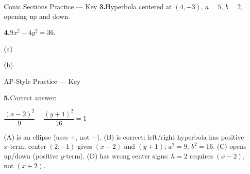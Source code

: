\documentclass[10pt]{article}
\begin{document}
\begin{notesbox}{Conic Sections Practice --- Key}
\vspace{10pt}
\textbf{3.}\quad Hyperbola centered at $(4,-3)$, $a=5$, $b=2$, opening up and down.

\vspace{6pt}

\vspace{4pt}

\vspace{10pt}
\textbf{4.}\quad $9x^2 - 4y^2 = 36$.

\vspace{4pt}
(a)\quad {}

\vspace{8pt}
(b)\quad {}

\end{notesbox}

\vspace{0.08in}

\begin{notesbox}{AP-Style Practice --- Key}

\textbf{5.}\quad Correct answer: 

$\dfrac{(x-2)^2}{9} - \dfrac{(y+1)^2}{16} = 1$

\begin{teachernote}
  (A) is an ellipse (uses $+$, not $-$). (B) is correct: left/right hyperbola has positive
  $x$-term; center $(2,-1)$ gives $(x-2)$ and $(y+1)$; $a^2=9$, $b^2=16$. (C) opens up/down
  (positive $y$-term). (D) has wrong center signs: $h=2$ requires $(x-2)$, not $(x+2)$.
\end{teachernote}

\end{notesbox}
\end{document}
